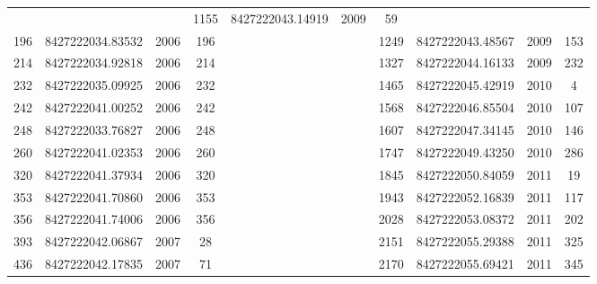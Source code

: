 \documentclass[crop=false,class=article,oneside]{standalone}
\begin{document}
\begin{table}[H]
\begin{tabular}{|ccccc|ccccc|}
                        &&&1155&8427222043.14919&2009& 59\\
                    196&8427222034.83532&2006&196
                        &&&1249&8427222043.48567&2009&153\\
                    214&8427222034.92818&2006&214
                        &&&1327&8427222044.16133&2009&232\\
                    232&8427222035.09925&2006&232
                        &&&1465&8427222045.42919&2010&  4\\
                    242&8427222041.00252&2006&242
                        &&&1568&8427222046.85504&2010&107\\
                    248&8427222033.76827&2006&248
                        &&&1607&8427222047.34145&2010&146\\
                    260&8427222041.02353&2006&260
                        &&&1747&8427222049.43250&2010&286\\
                    320&8427222041.37934&2006&320
                        &&&1845&8427222050.84059&2011& 19\\
                    353&8427222041.70860&2006&353
                        &&&1943&8427222052.16839&2011&117\\
                    356&8427222041.74006&2006&356
                        &&&2028&8427222053.08372&2011&202\\
                    393&8427222042.06867&2007&28
                        &&&2151&8427222055.29388&2011&325\\
                    436&8427222042.17835&2007&71
                        &&&2170&8427222055.69421&2011&345\\
                    \hline
                \end{tabular}
            \end{table}
\end{document}
